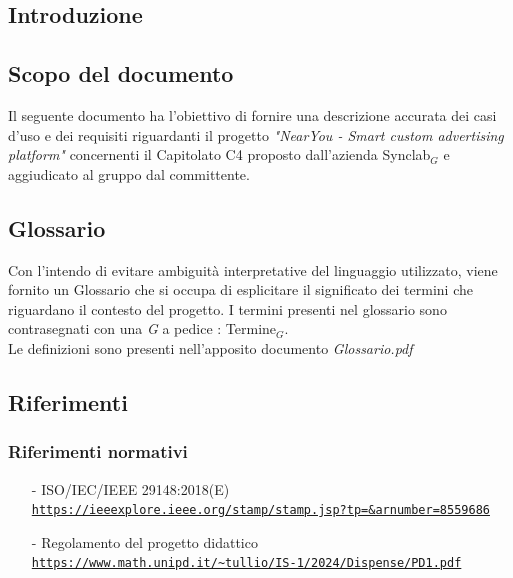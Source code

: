 \documentclass[11pt]{article}
\begin{document}
\newpage
\begin{justify}

\section{Introduzione}
\label{sec:intro}

\subsection{Scopo del documento}

Il seguente documento ha l'obiettivo di fornire una descrizione accurata dei casi d'uso e dei requisiti riguardanti il progetto \textit{"NearYou - 
Smart custom advertising platform"} concernenti il Capitolato C4 proposto dall'azienda Synclab$_G$ e aggiudicato al gruppo dal committente.


\subsection{Glossario}
Con l'intendo di evitare ambiguità interpretative del linguaggio utilizzato, viene fornito un Glossario che si occupa di esplicitare il significato dei termini che riguardano il contesto del progetto. I termini presenti nel glossario sono contrasegnati con una \textit{G} a pedice : Termine$_G$.\\
Le definizioni sono presenti nell'apposito documento \textit{Glossario.pdf}


\subsection{Riferimenti}

\subsubsection{Riferimenti normativi}
\begin{itemize}
    \item[-] ISO/IEC/IEEE 29148:2018(E) \\
    \textcolor{blue}{\texttt{\url{https://ieeexplore.ieee.org/stamp/stamp.jsp?tp=&arnumber=8559686}}}
    
    \item[-] Regolamento del progetto didattico  \\
    \textcolor{blue}{\texttt{\url{https://www.math.unipd.it/~tullio/IS-1/2024/Dispense/PD1.pdf}}}
    
\end{itemize}

\end{justify}
\end{document}
